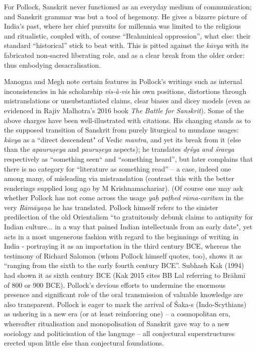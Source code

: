 \vskip 2pt

For Pollock, Sanskrit never functioned as an everyday medium of communication; and Sanskrit grammar was but a tool of hegemony. He gives a bizarre picture of India’s past, where her chief pursuits for millennia was limited to the religious and ritualistic, coupled with, of course “Brahminical oppression”, what else: their standard “historical” stick to beat with. This is pitted against the \textit{kāvya} with its fabricated non-sacred liberating role, and as a clear break from the older order: thus embodying desacralisation.

\vskip 2pt

Manogna and Megh note certain features in Pollock’s writings such as internal inconsistencies in his scholarship \textit{vis-à-vis} his own positions, distortions through mistranslations or unsubstantiated claims, clear biases and dicey models (even as evidenced in Rajiv Malhotra’s 2016 book \textit{The Battle for Sanskrit}). Some of the above charges have been well-illustrated with citations. His changing stands as to the supposed transition of Sanskrit from purely liturgical to mundane usages: \textit{kāvya} as a ``direct descendent" of Vedic \textit{mantra}, and yet its break from it (else than the \textit{apauruṣeya} and \textit{pauruṣeya} aspects); he translates \textit{dṛśya and śravya} respectively as “something seen“ and “something heard”, but later complains that there is no category for “literature as something read” – a case, indeed one among many, of misleading via mistranslation (contrast this with the better renderings supplied long ago by M Krishnamachariar). (Of course one may ask whether Pollock has not come across the usage \textit{yaḥ paṭhed rāma-caritam} in the very \textit{Rāmāyaṇa} he has translated. Pollock himself refers to the sinister predilection of the old Orientalism “to gratuitously debunk claims to antiquity for Indian culture... in a way that pained Indian intellectuals from an early date", yet acts in a most ungenerous fashion with regard to the beginnings of writing in India - portraying it as an importation in the third century BCE, whereas the testimony of Richard Salomon (whom Pollock himself quotes, too), shows it as “ranging from the sixth to the early fourth century BCE”. Subhash Kak (1994) had shown it as sixth century BCE (Kak 2015 cites BB Lal referring to Brāhmī of 800 or 900 BCE). Pollock’s devious efforts to undermine the enormous presence and significant role of the oral transmission of valuable knowledge are also transparent. Pollock is eager to mark the arrival of Śaka-s (Indo-Scythians) as ushering in a new era (or at least reinforcing one) – a cosmopolitan era, whereafter ritualisation and monopolisation of Sanskrit gave way to a new sociology and politicisation of the language – all conjectural superstructures erected upon little else than conjectural foundations.

